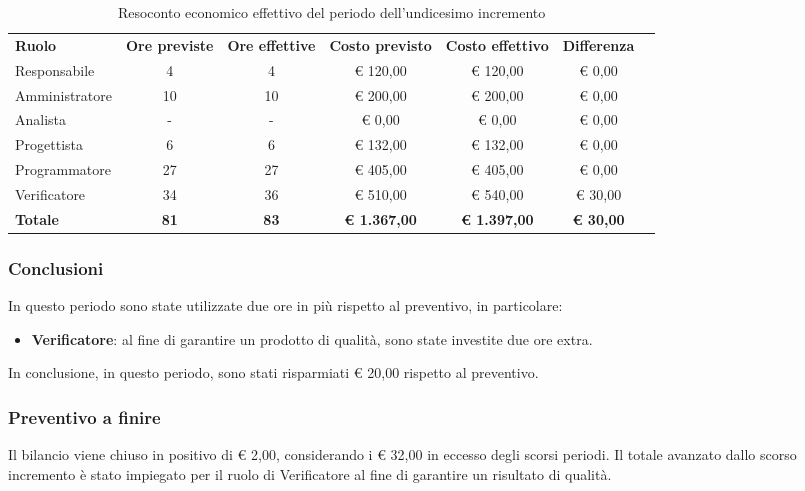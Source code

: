 \documentclass[../piano-di-progetto.tex]{subfiles}
\begin{document}
  \begin{table}[H]
    \centering
    \begin{tabular}{lcccccc}
      \rowcolor{lightgray}
      \textbf{Ruolo}  & \textbf{Ore previste} & \textbf{Ore effettive} & \textbf{Costo previsto} & \textbf{Costo effettivo} & \textbf{Differenza} \\

Responsabile    & 4           & 4           & € 120,00            & € 120,00            & € 0,00           \\
Amministratore  & 10          & 10          & € 200,00            & € 200,00            & € 0,00           \\
Analista        & -           & -           & € 0,00              & € 0,00              & € 0,00           \\
Progettista     & 6           & 6           & € 132,00            & € 132,00            & € 0,00           \\
Programmatore   & 27          & 27          & € 405,00            & € 405,00            & € 0,00           \\
Verificatore    & 34          & 36          & € 510,00            & € 540,00            & € 30,00          \\
\textbf{Totale} & \textbf{81} & \textbf{83} & \textbf{€ 1.367,00} & \textbf{€ 1.397,00} & \textbf{€ 30,00}


    \end{tabular}
    \caption{Resoconto economico effettivo del periodo dell'undicesimo incremento}
  \end{table}

\subsubsection{Conclusioni}
In questo periodo sono state utilizzate due ore in più rispetto al preventivo, in particolare:
\begin{itemize}
    \item \textbf{Verificatore}: al fine di garantire un prodotto di qualità, sono state investite due ore extra.
\end{itemize}
In conclusione, in questo periodo, sono stati risparmiati € 20,00 rispetto al preventivo.

\subsubsection{Preventivo a finire}
Il bilancio viene chiuso in positivo di € 2,00, considerando i € 32,00 in eccesso degli scorsi periodi. Il totale avanzato dallo scorso incremento è stato impiegato per il ruolo di Verificatore al fine di garantire un risultato di qualità.
\end{document}
